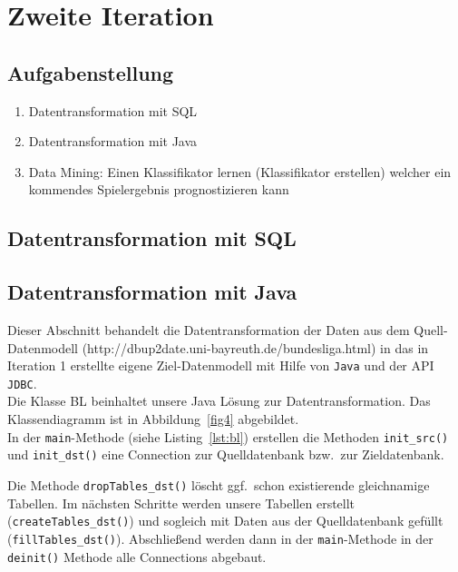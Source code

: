 \documentclass[
10pt,
a4paper
]{scrartcl}
\begin{document}
\section{ Zweite Iteration}

\subsection{Aufgabenstellung}

\begin{enumerate}
  \item Datentransformation mit SQL
  \item Datentransformation mit Java
  \item Data Mining: Einen Klassifikator lernen (Klassifikator erstellen) welcher ein kommendes Spielergebnis prognostizieren kann
\end{enumerate}

\subsection{Datentransformation mit SQL}


\subsection{Datentransformation mit Java}

Dieser Abschnitt behandelt die Datentransformation der Daten aus dem Quell-Datenmodell (http://dbup2date.uni-bayreuth.de/bundesliga.html) in das in Iteration 1 erstellte eigene Ziel-Datenmodell mit Hilfe von \texttt{Java} und der API \texttt{JDBC}.\\

Die Klasse BL beinhaltet unsere Java L\"{o}sung zur Datentransformation. Das Klassendiagramm ist in Abbildung~\ref{fig4} abgebildet.\\

In der \texttt{main}-Methode (siehe Listing~\ref{lst:bl}) erstellen die Methoden \texttt{init\_src()} und \texttt{init\_dst()} eine Connection zur Quelldatenbank bzw.~zur Zieldatenbank.



Die Methode \texttt{dropTables\_dst()} l\"{o}scht ggf.~schon existierende gleichnamige Tabellen. Im n\"{a}chsten Schritte werden unsere Tabellen erstellt (\texttt{createTables\_dst()}) und sogleich mit Daten aus der Quelldatenbank gef\"{u}llt (\texttt{fillTables\_dst()}). Abschlie{\ss}end werden dann in der \texttt{main}-Methode in der \texttt{deinit()} Methode alle Connections abgebaut. 
\end{document}
